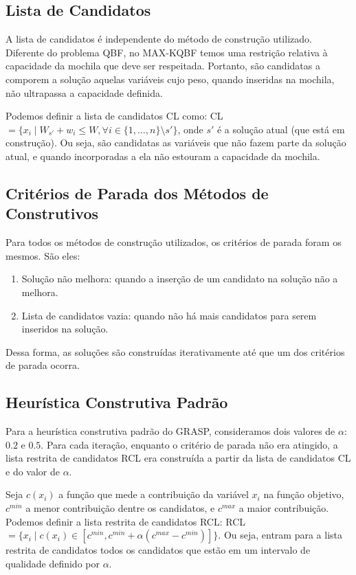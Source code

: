 \documentclass{article}
\theoremstyle{definition}
\begin{document}
\subsection{Lista de Candidatos}
A lista de candidatos é independente do método de construção utilizado. Diferente do problema QBF, no MAX-KQBF temos uma restrição relativa à capacidade da mochila que deve ser respeitada. Portanto, são candidatas a comporem a solução aquelas variáveis cujo peso, quando inseridas na mochila, não ultrapassa a capacidade definida.

Podemos definir a lista de candidatos CL como: CL $ = \{x_i \mid W_{s'} + w_i \leq W, \forall i \in \{1, \dots, n\} \setminus s'\}$, onde $s'$ é a solução atual (que está em construção). Ou seja, são candidatas as variáveis que não fazem parte da solução atual, e quando incorporadas a ela não estouram a capacidade da mochila.

\subsection{Critérios de Parada dos Métodos de Construtivos}
Para todos os métodos de construção utilizados, os critérios de parada foram os mesmos. São eles:
\begin{enumerate}
    \item Solução não melhora: quando a inserção de um candidato na solução não a melhora.
    \item Lista de candidatos vazia: quando não há mais candidatos para serem inseridos na solução.
\end{enumerate}

Dessa forma, as soluções são construídas iterativamente até que um dos critérios de parada ocorra.

\subsection{Heurística Construtiva Padrão}
Para a heurística construtiva padrão do GRASP, consideramos dois valores de $\alpha$: $0.2$ e $0.5$. Para cada iteração, enquanto o critério de parada não era atingido, a lista restrita de candidatos RCL era construída a partir da lista de candidatos CL e do valor de $\alpha$.

Seja $c(x_i)$ a função que mede a contribuição da variável $x_i$ na função objetivo, $c^{min}$ a menor contribuição dentre os candidatos, e $c^{max}$ a maior contribuição. Podemos definir a lista restrita de candidatos RCL: RCL $ = \{x_{i} \mid c(x_i) \in [c^{min}, c^{min} + \alpha(c^{max} - c^{min})]\}$. Ou seja, entram para a lista restrita de candidatos todos os candidatos que estão em um intervalo de qualidade definido por $\alpha$.
\end{document}
